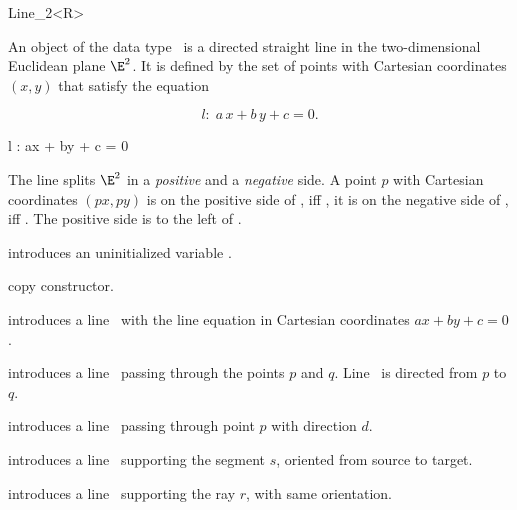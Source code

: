 \begin{ccRefClass} {Line_2<R>}

\ccDefinition
An object  of the data type \ccRefName\ is a directed
straight line in the two-dimensional Euclidean plane $\E^2$. It is
defined by the set of points with Cartesian coordinates $(x,y)$ 
that satisfy the equation 
\begin{ccTexOnly}
\[ l:\; a\, x +b\, y +c = 0. \]
\end{ccTexOnly}
\begin{ccHtmlOnly}
 l : ax + by + c = 0 
\end{ccHtmlOnly}
 
The line splits $\E^2$ in a {\em positive} and a {\em negative}
side. A point $p$ with Cartesian coordinates 
$(px, py)$ is on the positive side of , iff
, it is
on the negative side of , iff 
.
The positive side is to the left of .

\ccCreation
{}

\ccHidden {}
             {introduces an uninitialized variable \ccVar.}

\ccHidden {}
            {copy constructor.}

            {introduces a line \ccVar\ with the line equation in Cartesian
              coordinates $ax +by +c = 0$.}

            {introduces a line \ccVar\ passing through the points $p$ and $q$. 
             Line \ccVar\ is directed from $p$ to $q$.}

            {introduces a line \ccVar\ passing through point $p$ with 
             direction $d$.}

            {introduces a line \ccVar\ supporting the segment $s$,
            oriented from source to target.}

            {introduces a line \ccVar\ supporting the ray $r$,
            with same orientation.}

\ccOperations



\end{ccRefClass}
